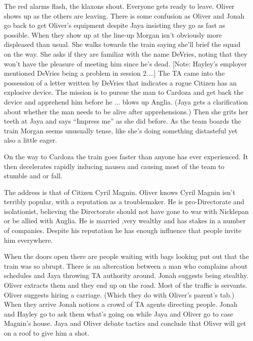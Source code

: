 The red alarms flash, the klaxons shout.  Everyone gets ready to leave.  Oliver shows up as the others are leaving.  There is some confusion as Oliver and Jonah go back to get Oliver's equipment despite Jaya insisting they go as fast as possible.  When they show up at the line-up Morgan isn't obviously more displeased than usual.  She walks towards the train saying she'll brief the squad on the way.  She asks if they are familiar with the name DeVries, noting that they won't have the pleasure of meeting him since he's dead.  {[}Note: Hayley's employer mentioned DeVries being a problem in session 2....{]}  The TA came into the possession of a letter written by DeVries that indicates a rogue Citizen has an explosive device.  The mission is to pursue the man to Cardoza and get back the device and apprehend him before he ... blows up Anglia.   (Jaya gets a clarification about whether the man needs to be alive after apprehensions.)  Then she grits her teeth at Jaya and says ``Impress me'' as she did before.  As the team boards the train Morgan seems unusually tense, like she's doing something distasteful yet also a little eager.



On the way to Cardoza the train goes faster than anyone has ever experienced.  It then decelerates rapidly inducing nausea and causing most of the team to stumble and or fall.

The address is that of Citizen Cyril Magnin.  Oliver knows Cyril Magnin isn't terribly popular, with a reputation as a troublemaker.  He is pro-Directorate and isolationist, believing the Directorate should not have gone to war with Nicklepan or be allied with Anglia.   He is married ,very wealthy and has stakes in a number of companies.  Despite his reputation he has enough influence that people invite him everywhere.



When the doors open there are people waiting with bags looking put out that the train was so abrupt.  There is an altercation between a man who complains about schedules and Jaya throwing TA authority around.  Jonah suggests being stealthy.  Oliver extracts them and they end up on the road.  Most of the traffic is servants.  Oliver suggests hiring a carriage.  (Which they do with Oliver's parent's tab.)  When they arrive Jonah notices a crowd of TA agents directing people.  Jonah and Hayley go to ask them what's going on while Jaya and Oliver go to case Magnin's house.  Jaya and Oliver debate tactics and conclude that Oliver will get on a roof to give him a shot.



